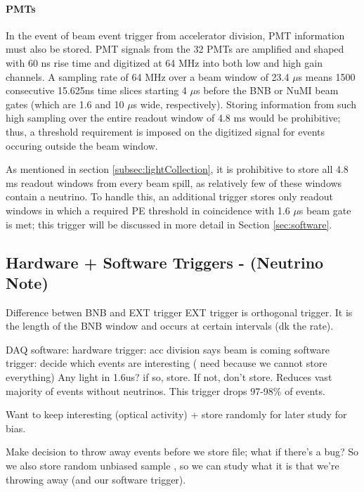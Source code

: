 \documentclass[12pt]{article}
\begin{document}
\paragraph{PMTs}
In the event of beam event trigger from accelerator division, PMT information must also be stored. PMT signals from the 32 PMTs are amplified and shaped with 60 ns rise time and digitized at 64 MHz into both low and high gain channels. A sampling rate of 64 MHz over a beam window of 23.4 $\mu$s means 1500 consecutive 15.625ns time slices starting 4 $\mu$s before the BNB or NuMI beam gates (which are 1.6 and 10 $\mu$s wide, respectively). Storing information from such high sampling over the entire readout window of 4.8 ms would be prohibitive; thus, a threshold requirement is imposed on the digitized signal for events occuring outside the beam window. \\
\par As mentioned in section \ref{subsec:lightCollection}, it is prohibitive to store all 4.8 ms readout windows from every beam spill, as relatively few of these windows contain a neutrino. To handle this, an additional trigger stores only readout windows in which a required PE threshold in coincidence with 1.6 $\mu$s beam gate is met; this trigger will be discussed in more detail in Section \ref{sec:software}.


\subsection{Hardware + Software Triggers - (Neutrino Note) }
Difference betwen BNB and EXT trigger
EXT trigger is orthogonal trigger. It is the length of the BNB window and occurs at certain intervals (dk the rate).  

DAQ software:
hardware trigger: acc division says beam is coming
software trigger: decide which events are interesting ( need because we cannot store everything) 
Any light in 1.6us? if so, store. If not, don't store. Reduces vast majority of events without neutrinos.  This trigger drops 97-98\% of events. 

Want to keep interesting (optical activity) + store randomly for later study for bias.  

Make decision to throw away events before we store file; what if there's a bug? So we also store random unbiased sample , so we can study what it is that we're throwing away (and our software trigger). 
\end{document}
